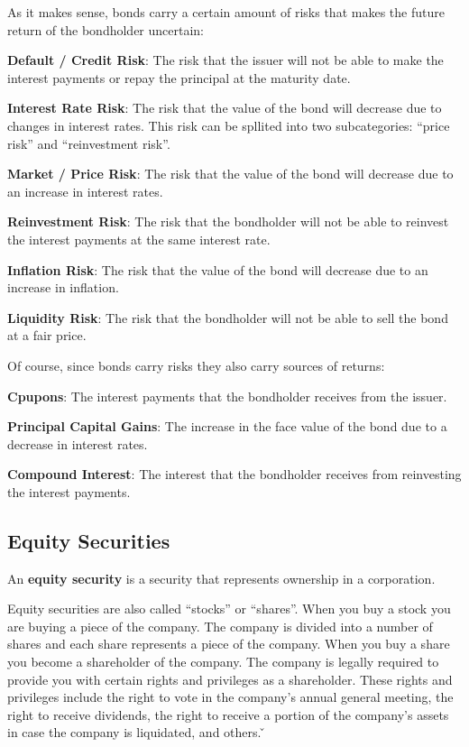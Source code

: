 As it makes sense, bonds carry a certain amount of risks that makes the future return of the bondholder uncertain:
\bit
\item \textbf{Default / Credit Risk}: The risk that the issuer will not be able to make the interest payments or repay
the principal at the maturity date.
\item \textbf{Interest Rate Risk}: The risk that the value of the bond will decrease due to changes in interest rates.
This risk can be spllited into two subcategories: ``price risk'' and ``reinvestment risk''.
\bit
\item \textbf{Market / Price Risk}: The risk that the value of the bond will decrease due to an increase in interest
rates.
\item \textbf{Reinvestment Risk}: The risk that the bondholder will not be able to reinvest the interest payments at
the same interest rate.
\eit
\item \textbf{Inflation Risk}: The risk that the value of the bond will decrease due to an increase in inflation.
\item \textbf{Liquidity Risk}: The risk that the bondholder will not be able to sell the bond at a fair price.
\eit

Of course, since bonds carry risks they also carry sources of returns:
\bit
\item \textbf{Cpupons}: The interest payments that the bondholder receives from the issuer.
\item \textbf{Principal Capital Gains}: The increase in the face value of the bond due to a decrease in interest rates.
\item \textbf{Compound Interest}: The interest that the bondholder receives from reinvesting the interest payments.
\eit

\subsection{Equity Securities}

An \textbf{equity security} is a security that represents ownership in a corporation.
\ed

Equity securities are also called ``stocks'' or ``shares''. When you buy a stock you are buying a piece of the
company. The company is divided into a number of shares and each share represents a piece of the company. When you
buy a share you become a shareholder of the company. The company is legally required to provide you with certain
rights and privileges as a shareholder. These rights and privileges include the right to vote in the company's annual
general meeting, the right to receive dividends, the right to receive a portion of the company's assets in case the
company is liquidated, and others. \v


